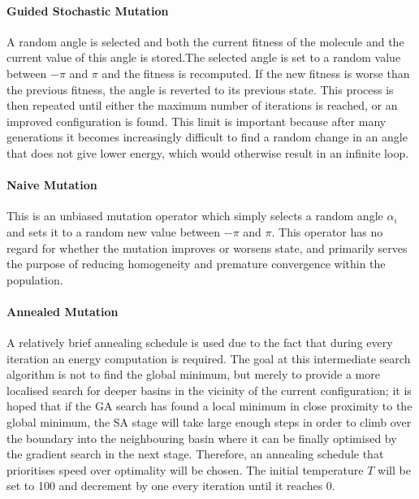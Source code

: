 \documentclass{article}
\begin{document}
\paragraph{Guided Stochastic Mutation}


A random angle is selected and both the current fitness of the molecule and the
current value of this angle is stored.The selected angle is set to a random
value between $-\pi$ and $\pi$ and the fitness is recomputed. If the new fitness
is worse than the previous fitness, the angle is reverted to its previous state.
This process is then repeated until either the maximum number of iterations is
reached, or an improved configuration is found. This limit is important because
after many generations it becomes increasingly difficult to find a random change
in an angle that does not give lower energy, which would otherwise result in an
infinite loop.

\paragraph{Naive Mutation}

This is an unbiased mutation operator which simply selects a random angle
$\alpha_i$ and sets it to a random new value between $-\pi$ and $\pi$. This
operator has no regard for whether the mutation improves or worsens state, and
primarily serves the purpose of reducing homogeneity and premature convergence
within the population.

\paragraph{Annealed Mutation}

A relatively brief annealing schedule is used due to the fact that during every
iteration an energy computation is required. The goal at this intermediate
search algorithm is not to find the global minimum, but merely to provide a more
localised search for deeper basins in the vicinity of the current configuration;
it is hoped that if the GA search has found a local minimum in close proximity
to the global minimum, the SA stage will take large enough steps in order to
climb over the boundary into the neighbouring basin where it can be finally
optimised by the gradient search in the next stage. Therefore, an annealing
schedule that prioritises speed over optimality will be chosen. The initial
temperature $T$ will be set to 100 and decrement by one every iteration until it
reaches 0.
\end{document}
